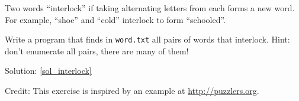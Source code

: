 \begin{exercise}
\label{interlock}

Two words ``interlock'' if taking alternating letters from 
each forms a new word.  For example, ``shoe'' and ``cold''
interlock to form ``schooled''.

Write a program that finds in {\tt word.txt} all pairs of 
words that interlock. Hint: don't enumerate all pairs, there 
are many of them!

Solution: \ref{sol_interlock}

Credit: This exercise is inspired by an example at \url{http://puzzlers.org}.

\end{exercise}


